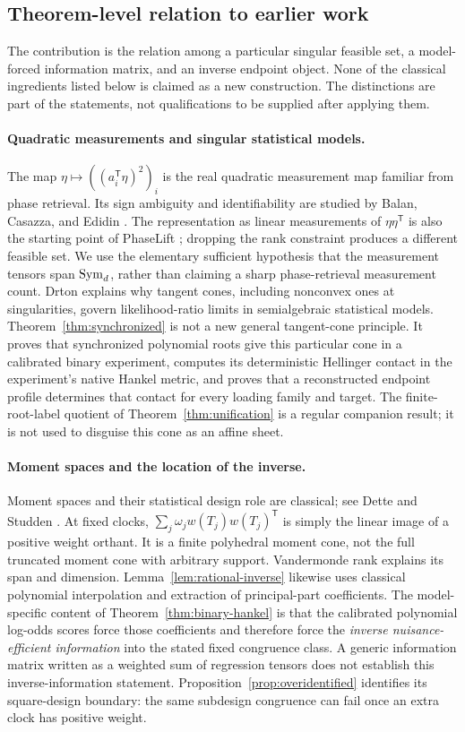 \subsection{Theorem-level relation to earlier work}
The contribution is the relation among a particular singular feasible set, a model-forced information matrix, and an inverse endpoint object. None of the classical ingredients listed below is claimed as a new construction. The distinctions are part of the statements, not qualifications to be supplied after applying them.

\paragraph{Quadratic measurements and singular statistical models.}
The map $\eta\mapsto((a_i^{\mathsf T}\eta)^2)_i$ is the real quadratic measurement map familiar from phase retrieval. Its sign ambiguity and identifiability are studied by Balan, Casazza, and Edidin \cite{BCE}. The representation as linear measurements of $\eta\eta^{\mathsf T}$ is also the starting point of PhaseLift \cite{CSV}; dropping the rank constraint produces a different feasible set. We use the elementary sufficient hypothesis that the measurement tensors span $\operatorname{Sym}_d$, rather than claiming a sharp phase-retrieval measurement count. Drton \cite{Drton} explains why tangent cones, including nonconvex ones at singularities, govern likelihood-ratio limits in semialgebraic statistical models. Theorem~\ref{thm:synchronized} is not a new general tangent-cone principle. It proves that synchronized polynomial roots give this particular cone in a calibrated binary experiment, computes its deterministic Hellinger contact in the experiment's native Hankel metric, and proves that a reconstructed endpoint profile determines that contact for every loading family and target. The finite-root-label quotient of Theorem~\ref{thm:unification} is a regular companion result; it is not used to disguise this cone as an affine sheet.

\paragraph{Moment spaces and the location of the inverse.}
Moment spaces and their statistical design role are classical; see Dette and Studden \cite{DS}. At fixed clocks, $\sum_j\omega_jw(T_j)w(T_j)^{\mathsf T}$ is simply the linear image of a positive weight orthant. It is a finite polyhedral moment cone, not the full truncated moment cone with arbitrary support. Vandermonde rank explains its span and dimension. Lemma~\ref{lem:rational-inverse} likewise uses classical polynomial interpolation and extraction of principal-part coefficients. The model-specific content of Theorem~\ref{thm:binary-hankel} is that the calibrated polynomial log-odds scores force those coefficients and therefore force the \emph{inverse nuisance-efficient information} into the stated fixed congruence class. A generic information matrix written as a weighted sum of regression tensors does not establish this inverse-information statement. Proposition~\ref{prop:overidentified} identifies its square-design boundary: the same subdesign congruence can fail once an extra clock has positive weight.

